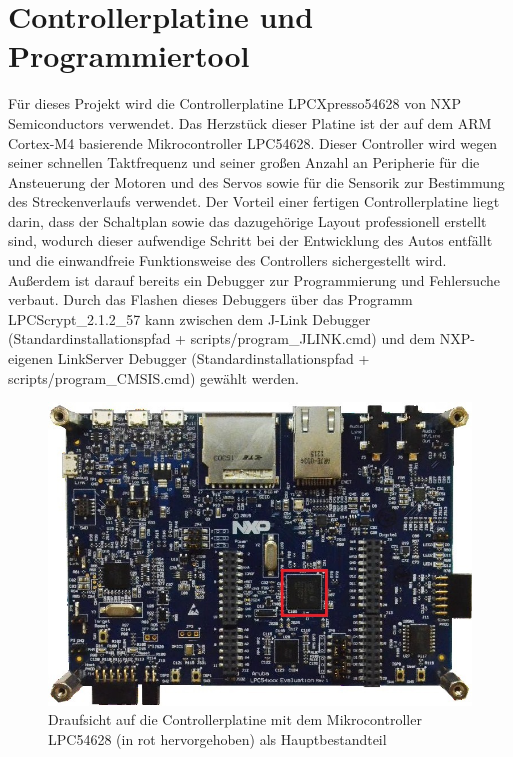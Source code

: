 

\pagestyle{fancy}
\rhead{\thepage} \chead{} 
\cfoot{}

\section{Controllerplatine und Programmiertool}\label{Sec3}

Für dieses Projekt wird die Controllerplatine LPCXpresso54628 von NXP Semiconductors verwendet. Das Herzstück dieser Platine ist der auf dem ARM Cortex-M4 basierende Mikrocontroller LPC54628. Dieser Controller wird wegen seiner schnellen Taktfrequenz und seiner großen Anzahl an Peripherie für die Ansteuerung der Motoren und des Servos sowie für die Sensorik zur Bestimmung des Streckenverlaufs verwendet. Der Vorteil einer fertigen Controllerplatine liegt darin, dass der Schaltplan sowie das dazugehörige Layout professionell erstellt sind, wodurch dieser aufwendige Schritt bei der Entwicklung des Autos entfällt und die einwandfreie Funktionsweise des Controllers sichergestellt wird. Außerdem ist darauf bereits ein Debugger zur Programmierung und Fehlersuche verbaut. Durch das Flashen dieses Debuggers über das Programm \glqq{}LPCScrypt\_2.1.2\_57\grqq{} kann zwischen dem J-Link Debugger (Standardinstallationspfad + scripts/program\_JLINK.cmd) und dem NXP-eigenen LinkServer Debugger (Standardinstallationspfad + scripts/program\_CMSIS.cmd) gewählt werden. 

\begin{figure}[H] %
	\includegraphics[width=.80\textwidth]{sec3/images/Controllerplatine} 
	\centering
	\captionsetup{width=.95\textwidth}
	\caption[Controllerplatine LPCXpresso54628 ~\protect\cite{Semic}]{Draufsicht auf die Controllerplatine mit dem Mikrocontroller LPC54628  (in rot hervorgehoben) als Hauptbestandteil ~\protect\cite{Semic}}\centering
	\label{fig:Controllerplatine}
\end{figure}

